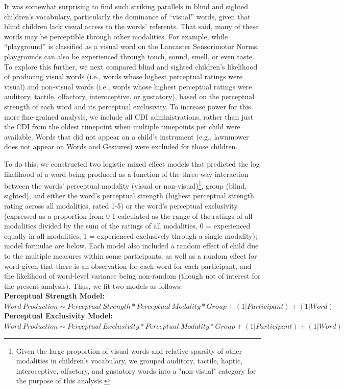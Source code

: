 \documentclass[english,man,floatsintext]{apa6}
\begin{document}
It was somewhat surprising to find such striking parallels in blind and sighted children's vocabulary, particularly the dominance of \enquote{visual} words, given that blind children lack visual access to the words' referents. That said, many of these words may be perceptible through other modalities. For example, while \enquote{playground} is classified as a visual word on the Lancaster Sensorimotor Norms, playgrounds can also be experienced through touch, sound, smell, or even taste. To explore this further, we next compared blind and sighted children's likelihood of producing visual words (i.e., words whose highest perceptual ratings were visual) and non-visual words (i.e., words whose highest perceptual ratings were auditory, tactile, olfactory, interoceptive, or gustatory), based on the perceptual strength of each word and its perceptual exclusivity. To increase power for this more fine-grained analysis, we include all CDI administrations, rather than just the CDI from the oldest timepoint when multiple timepoints per child were available. Words that did not appear on a child's instrument (e.g., lawnmower does not appear on Words and Gestures) were excluded for those children.

To do this, we constructed two logistic mixed effect models that predicted the log likelihood of a word being produced as a function of the three way interaction between the words' perceptual modality (visual or non-visual)\footnote{Given the large proportion of visual words and relative sparsity of other modalities in children's vocabulary, we grouped auditory, tactile, haptic, interoceptive, olfactory, and gustatory words into a "non-visual" category for the purpose of this analysis.}, group (blind, sighted), and either the word's perceptual strength (highest perceptual strength rating across all modalities, rated 1-5) or the word's perceptual exclusivity (expressed as a proportion from 0-1 calculated as the range of the ratings of all modalities divided by the sum of the ratings of all modalities. 0 = experienced equally in all modalities, 1 = experienced exclusively through a single modality); model formulae are below. Each model also included a random effect of child due to the multiple measures within some participants, as well as a random effect for word given that there is an observation for each word for each participant, and the likelihood of word-level variance being non-random (though not of interest for the present analysis). Thus, we fit two models as follows:\\
\textbf{Perceptual Strength Model:} \(Word\ Production \sim Perceptual\ Strength * Perceptual\ Modality * Group + (1|Participant) + (1|Word)\)\\
\textbf{Perceptual Exclusivity Model:} \(Word\ Production \sim Perceptual\ Exclusivity * Perceptual\ Modality * Group + (1|Participant) + (1|Word)\)
\end{document}
